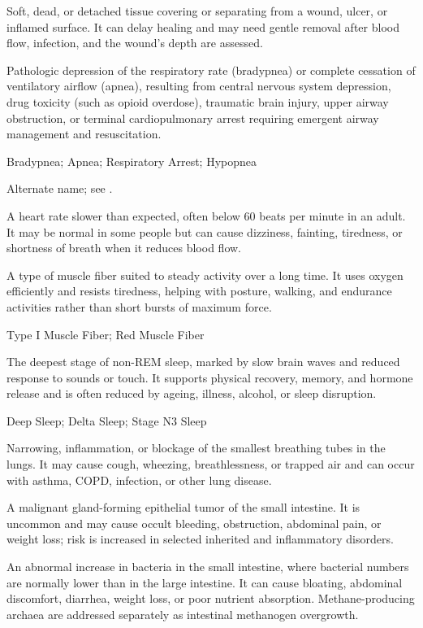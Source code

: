  Soft, dead, or detached tissue covering or separating from a wound, ulcer, or inflamed surface. It can delay healing and may need gentle removal after blood flow, infection, and the wound’s depth are assessed.

 Pathologic depression of the respiratory rate (bradypnea) or complete cessation of ventilatory airflow (apnea), resulting from central nervous system depression, drug toxicity (such as opioid overdose), traumatic brain injury, upper airway obstruction, or terminal cardiopulmonary arrest requiring emergent airway management and resuscitation.

\synonyms
Bradypnea; Apnea; Respiratory Arrest; Hypopnea

 Alternate name; see .

 A heart rate slower than expected, often below 60 beats per minute in an adult. It may be normal in some people but can cause dizziness, fainting, tiredness, or shortness of breath when it reduces blood flow.

 A type of muscle fiber suited to steady activity over a long time. It uses oxygen efficiently and resists tiredness, helping with posture, walking, and endurance activities rather than short bursts of maximum force.

\synonyms
Type I Muscle Fiber; Red Muscle Fiber

 The deepest stage of non-REM sleep, marked by slow brain waves and reduced response to sounds or touch. It supports physical recovery, memory, and hormone release and is often reduced by ageing, illness, alcohol, or sleep disruption.

\synonyms
Deep Sleep; Delta Sleep; Stage N3 Sleep

 Narrowing, inflammation, or blockage of the smallest breathing tubes in the lungs. It may cause cough, wheezing, breathlessness, or trapped air and can occur with asthma, COPD, infection, or other lung disease.

 A malignant gland-forming epithelial tumor of the small intestine. It is uncommon and may cause occult bleeding, obstruction, abdominal pain, or weight loss; risk is increased in selected inherited and inflammatory disorders.

 An abnormal increase in bacteria in the small intestine, where bacterial numbers are normally lower than in the large intestine. It can cause bloating, abdominal discomfort, diarrhea, weight loss, or poor nutrient absorption. Methane-producing archaea are addressed separately as intestinal methanogen overgrowth.

